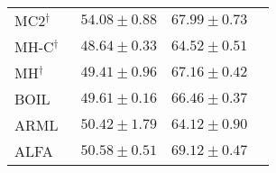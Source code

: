 \begin{table}[t!]
{\begin{tabular}{lccc}
    MC2$^{\dagger}$~\cite{park2019meta}                            & \quad \; $54.08 \pm 0.88$                     & \quad \; $67.99 \pm 0.73$\\
    MH-C$^{\dagger}$~\cite{zhao2020meta}                           & \quad \; $48.64 \pm 0.33$                     & \quad \; $64.52 \pm 0.51$\\
    MH$^{\dagger}$~\cite{zhao2020meta}                             & \quad \; $49.41 \pm 0.96$                     & \quad \; $67.16 \pm 0.42$\\
    BOIL~\cite{oh2020boil}                             & \quad \; $49.61 \pm 0.16$                     & \quad \; $66.46 \pm 0.37$\\
    
    
    ARML~\cite{yao2020automated}                       & \quad \; $50.42 \pm 1.79$                     & \quad \; $64.12 \pm 0.90$\\
    ALFA~\cite{baik2020meta}                           & \quad \; $50.58 \pm 0.51$                     & \quad \; $69.12 \pm 0.47$\\
    

\end{tabular}}
\end{table}
